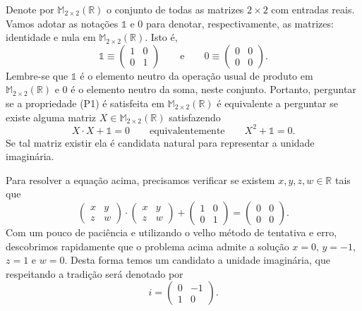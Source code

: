 Denote por $\mathbb{M}_{2\times 2}(\mathbb{R})$ o conjunto de todas as matrizes $2\times 2$ com entradas reais.
Vamos adotar as notações $\mathds{1}$ e $0$ para denotar, respectivamente, as matrizes: identidade e nula em $\mathbb{M}_{2\times 2}(\mathbb{R})$. Isto é, 
\[
\mathds{1}
\equiv
\begin{pmatrix}
1&0\\
0&1
\end{pmatrix} 
\qquad\text{e}\qquad 
0 
\equiv
\begin{pmatrix}
0&0\\
0&0
\end{pmatrix}.  
\]
Lembre-se que $\mathds{1}$ é o elemento neutro da operação usual de produto em $\mathbb{M}_{2\times 2}(\mathbb{R})$
e $0$ é o elemento neutro da soma, neste conjunto. 
Portanto, perguntar se a propriedade (P1) é satisfeita
em $\mathbb{M}_{2\times 2}(\mathbb{R})$ é equivalente a perguntar se existe
alguma matriz $X\in \mathbb{M}_{2\times 2}(\mathbb{R})$ satisfazendo 
\[
X\cdot X +\mathds{1} =0
\qquad \text{equivalentemente} \qquad 
X^2+\mathds{1}= 0.
\]
Se tal matriz existir ela é candidata natural para representar a unidade imaginária. 

Para resolver a equação acima, precisamos verificar se existem $x,y,z,w\in\mathbb{R}$ tais que 
\[
\begin{pmatrix}
x&y\\
z&w
\end{pmatrix}
\cdot
\begin{pmatrix}
x&y\\
z&w
\end{pmatrix}
+
\begin{pmatrix}
1&0\\
0&1
\end{pmatrix}
=
\begin{pmatrix}
0&0\\
0&0
\end{pmatrix}.
\] 
Com um pouco de paciência e utilizando o velho método de tentativa e erro, descobrimos rapidamente que 
o problema acima admite a solução $x=0$, $y=-1$, $z=1$ e $w=0$. Desta forma temos um candidato a unidade 
imaginária, que respeitando a tradição será denotado por
\[
i
=
\begin{pmatrix}
0&-1\\
1&0
\end{pmatrix}.
\]

